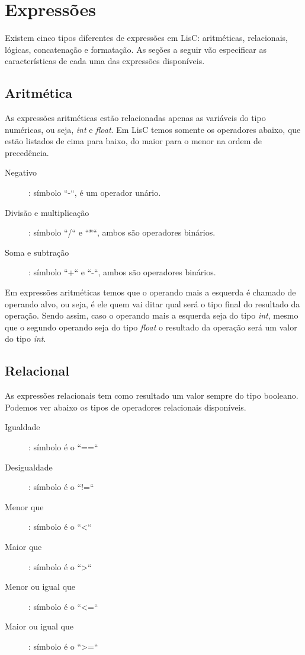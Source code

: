\documentclass[
  12pt,				%
  oneside,			%
  a4paper,			%
  english,			%
  french,				%
  spanish,			%
  brazil,				%
]{abntex2}
\begin{document}
\section{Expressões}
\label{sec:expressoes}

Existem cinco tipos diferentes de expressões em LisC: aritméticas,
relacionais, lógicas, concatenação e formatação. As seções a seguir
vão especificar as características de cada uma das expressões
disponíveis. 

\subsection{Aritmética}
\label{subsec:aritmeticas}

As expressões aritméticas estão relacionadas apenas as variáveis do tipo numéricas,
ou seja, \emph{int} e \emph{float}. Em LisC temos somente os
operadores abaixo, que estão listados de cima para baixo, do maior
para o menor na ordem de precedência.

\begin{description}
\item [Negativo]: símbolo ``-``, é um operador unário.
\item [Divisão e multiplicação]: símbolo ``/`` e ``*``, ambos são
  operadores binários.
\item [Soma e subtração]: símbolo ``+`` e ``-``, ambos são operadores binários.
\end{description}

Em expressões aritméticas temos que o operando mais a esquerda é
chamado de operando alvo, ou seja, é ele quem vai ditar qual será o
tipo final do resultado da operação. Sendo assim, caso o operando mais
a esquerda seja do tipo \emph{int}, mesmo que o segundo operando seja
do tipo \emph{float} o resultado da operação será um valor do tipo \emph{int}.

\subsection{Relacional}
\label{subsec:relacionais}

As expressões relacionais tem como resultado um valor sempre do tipo
booleano. Podemos ver abaixo os tipos de operadores relacionais
disponíveis.

\begin{description}
\item [Igualdade]: símbolo é o ``==``
\item [Desigualdade]: símbolo é o ``!=``
\item [Menor que]: símbolo é o ``<``
\item [Maior que]: símbolo é o ``>``
\item [Menor ou igual que]: símbolo é o ``<=``
\item [Maior ou igual que]: símbolo é o ``>=``
\end{description}
\end{document}
